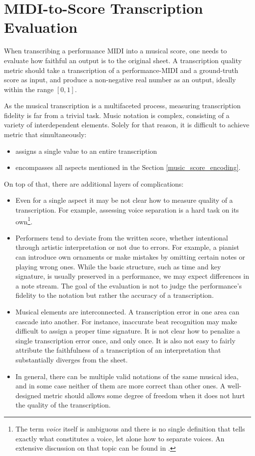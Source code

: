 \chapter{MIDI-to-Score Transcription Evaluation}\label{midi_to_score_transcription_evaluation}

When transcribing a performance MIDI into a musical score, one needs to evaluate how faithful an output is to the original sheet. A transcription quality metric should take a transcription of a performance-MIDI and a ground-truth score as input, and produce a non-negative real number as an output, ideally within the range $[0, 1]$.

As the musical transcription is a multifaceted process, measuring transcription fidelity is far from a trivial task. Music notation is complex, consisting of a variety of interdependent elements. Solely for that reason, it is difficult to achieve metric that simultaneously: \begin{itemize}
	\item assigns a single value to an entire transcription
	\item encompasses all aspects mentioned in the Section \ref{music_score_encoding}. 
\end{itemize}

On top of that, there are additional layers of complications: \begin{itemize}
	\item Even for a single aspect it may be not clear how to measure quality of a transcription. For example, assessing voice separation is a hard task on its own\footnote{The term \emph{voice} itself is ambiguous and there is no single definition that tells exactly what constitutes a voice, let alone how to separate voices. An extensive discussion on that topic can be found in \cite{Cambouropoulos2008}.}.
	\item Performers tend to deviate from the written score, whether intentional through artistic interpretation or not due to errors. For example, a pianist can introduce own ornaments or make mistakes by omitting certain notes or playing wrong ones. While the basic structure, such as time and key signature, is usually preserved in a performance, we may expect differences in a note stream. The goal of the evaluation is not to judge the performance's fidelity to the notation but rather the accuracy of a transcription.
	\item Musical elements are interconnected. A transcription error in one area can cascade into another. For instance, inaccurate beat recognition may make difficult to assign a proper time signature. It is not clear how to penalize a single transcription error once, and only once. It is also not easy to fairly attribute the faithfulness of a transcription of an interpretation that substantially diverges from the sheet.
	\item In general, there can be multiple valid notations of the same musical idea, and in some case neither of them are more correct than other ones. A well-designed metric should allows some degree of freedom when it does not hurt the quality of the transcription.
\end{itemize}

